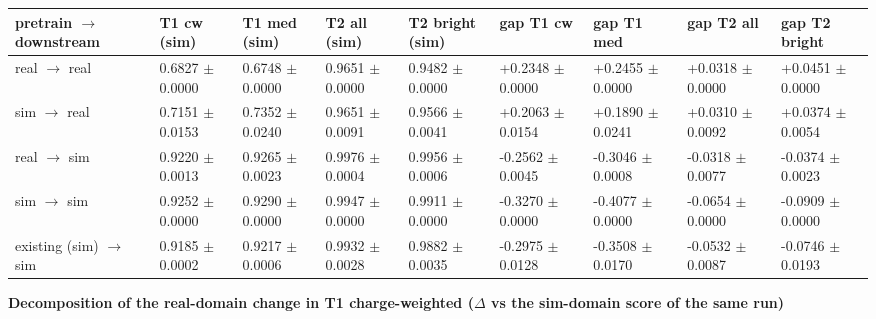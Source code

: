 \documentclass[10pt,a4paper]{article}
\begin{document}
\begin{center}\scriptsize
\setlength{\tabcolsep}{3pt}\renewcommand{\arraystretch}{1.15}
\begin{tabularx}{\linewidth}{LLLLLLLLL}
\toprule
\textbf{pretrain $\rightarrow$ downstream} & \textbf{T1 cw (sim)} & \textbf{T1 med (sim)} & \textbf{T2 all (sim)} & \textbf{T2 bright (sim)} & \textbf{gap T1 cw} & \textbf{gap T1 med} & \textbf{gap T2 all} & \textbf{gap T2 bright} \\
\midrule
real $\rightarrow$ real & 0.6827 $\pm$ 0.0000 & 0.6748 $\pm$ 0.0000 & 0.9651 $\pm$ 0.0000 & 0.9482 $\pm$ 0.0000 & +0.2348 $\pm$ 0.0000 & +0.2455 $\pm$ 0.0000 & +0.0318 $\pm$ 0.0000 & +0.0451 $\pm$ 0.0000 \\
sim $\rightarrow$ real & 0.7151 $\pm$ 0.0153 & 0.7352 $\pm$ 0.0240 & 0.9651 $\pm$ 0.0091 & 0.9566 $\pm$ 0.0041 & +0.2063 $\pm$ 0.0154 & +0.1890 $\pm$ 0.0241 & +0.0310 $\pm$ 0.0092 & +0.0374 $\pm$ 0.0054 \\
real $\rightarrow$ sim & 0.9220 $\pm$ 0.0013 & 0.9265 $\pm$ 0.0023 & 0.9976 $\pm$ 0.0004 & 0.9956 $\pm$ 0.0006 & -0.2562 $\pm$ 0.0045 & -0.3046 $\pm$ 0.0008 & -0.0318 $\pm$ 0.0077 & -0.0374 $\pm$ 0.0023 \\
sim $\rightarrow$ sim & 0.9252 $\pm$ 0.0000 & 0.9290 $\pm$ 0.0000 & 0.9947 $\pm$ 0.0000 & 0.9911 $\pm$ 0.0000 & -0.3270 $\pm$ 0.0000 & -0.4077 $\pm$ 0.0000 & -0.0654 $\pm$ 0.0000 & -0.0909 $\pm$ 0.0000 \\
existing (sim) $\rightarrow$ sim & 0.9185 $\pm$ 0.0002 & 0.9217 $\pm$ 0.0006 & 0.9932 $\pm$ 0.0028 & 0.9882 $\pm$ 0.0035 & -0.2975 $\pm$ 0.0128 & -0.3508 $\pm$ 0.0170 & -0.0532 $\pm$ 0.0087 & -0.0746 $\pm$ 0.0193 \\
\bottomrule
\end{tabularx}
\end{center}
\textbf{Decomposition of the real-domain change in T1 charge-weighted ($\Delta$ vs the sim-domain score of the same run)}
\end{document}
